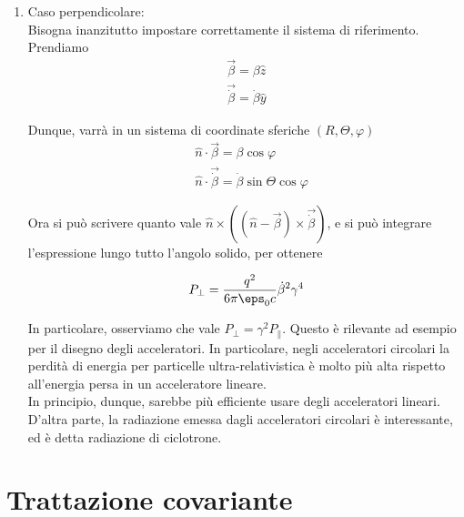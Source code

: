 \documentclass{report}
\begin{document}
\begin{enumerate}
\begin{enumerate}
    La potenza totale può essere ottenuta analiticamente integrando l'espressione non linearizzata, e si ottiene 
    \begin{align}
        P_{\parallel} = \frac{q^2}{6\pi \eps_0 c}\gamma^6\dot{\beta}^2
    \end{align}

    \item Caso perpendicolare:  \\
    Bisogna inanzitutto impostare correttamente il sistema di riferimento. Prendiamo 
    \begin{align}
        \vec{\beta} = \beta \hat{z} \\
        \vec{\dot{\beta}} = \dot{\beta}\hat{y}
    \end{align}

    Dunque, varrà in un sistema di coordinate sferiche \((R, \Theta, \varphi)\)
    \begin{align}
        &\hat{n}\cdot \vec{\beta} = \beta\cos\varphi \\
        &\hat{n}\cdot\vec{\dot{\beta}} = \dot{\beta}\sin\Theta\cos\varphi
    \end{align}

    Ora si può scrivere quanto vale \(\hat{n}\times((\hat{n}-\vec{\beta})\times\vec{\dot{\beta}})\), e si può integrare l'espressione lungo tutto l'angolo solido, per ottenere 

    \begin{align}
        P_{\perp} = \frac{q^2}{6\pi\eps_0 c}\dot{\beta}^2\gamma^4
    \end{align}


    In particolare, osserviamo che vale \(P_{\perp} = \gamma^2 P_{\parallel}\). Questo è rilevante ad esempio per il disegno degli acceleratori. In particolare, negli acceleratori circolari la perdità di energia per particelle ultra-relativistica è molto più alta rispetto all'energia persa in un acceleratore lineare. \\
    In principio, dunque, sarebbe più efficiente usare degli acceleratori lineari. D'altra parte, la radiazione emessa dagli acceleratori circolari è interessante, ed è detta radiazione di ciclotrone.  
    \end{enumerate}
\end{enumerate}

\section{Trattazione covariante}
\end{document}
